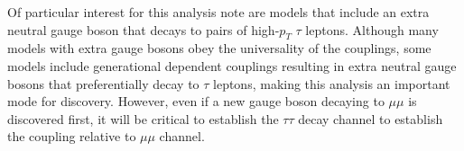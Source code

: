 Of particular interest for this analysis note are models that include an extra neutral gauge boson that decays to pairs of high-$p_{T}$ $\tau$ leptons. Although 
many models with extra gauge bosons obey the universality of the couplings, some models include generational dependent couplings resulting in extra neutral gauge 
bosons that preferentially decay to $\tau$ leptons, making this analysis an important mode for discovery. However, even if a new gauge boson decaying to $\mu\mu$ 
is discovered first, it will be critical to establish the $\tau\tau$ decay channel to establish the coupling relative to $\mu\mu$ channel.
